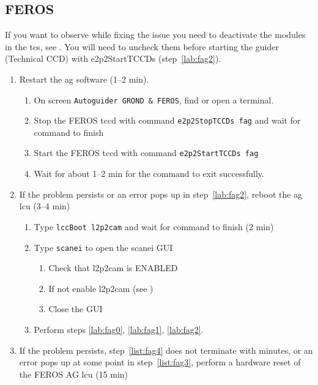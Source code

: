 \documentclass[11pt,fleqn,a4paper]{book}
\begin{document}
\subsection{FEROS}
If you want to observe while fixing the issue you need to deactivate the modules in the \gls{tcs}, see .  You will need to uncheck them before starting the guider (Technical CCD) with \gls{e2p2StartTCCDs} (step~\ref{lab:fag2}). 

\label{proc:restartfag}
\begin{enumerate}
    \item Restart the \gls{ag} software (1--2 min).
        \begin{enumerate}
            \item\label{lab:fag0} On screen \texttt{Autoguider GROND \& FEROS}, find or open a terminal.
            \item Stop the FEROS \acrlong{tccd} with command
                  \texttt{\gls{e2p2StopTCCDs} fag} and wait for command to finish
            \item\label{lab:fag1} Start the FEROS \acrlong{tccd} with command
                  \texttt{\gls{e2p2StartTCCDs} fag} 
            \item\label{lab:fag2} Wait for about 1--2 min for the command to exit successfully.
        \end{enumerate}
    \item\label{list:fag3} If the problem persists or an error pops up in step~\ref{lab:fag2}, reboot the \gls{ag} \gls{lcu} (3--4 min) 
        \begin{enumerate}
            \item\label{list:fag4} Type \texttt{\gls{lccBoot} \gls{l2p2cam}} and wait for command to finish (2 min)
            \item Type \texttt{scanei} to open the scanei GUI
            \begin{enumerate}
                \item Check that l2p2cam is ENABLED
                \item If not enable l2p2cam (see )
                \item Close the GUI
            \end{enumerate}
            \item Perform steps \ref{lab:fag0}, \ref{lab:fag1}, \ref{lab:fag2}.
        \end{enumerate}
    \item If the problem persists, step~\ref{list:fag4} does not terminate with minutes, or an error pops up at some point in step~\ref{list:fag3}, perform a hardware reset of the FEROS AG \gls{lcu} (15 min)

\end{enumerate}
\end{document}

